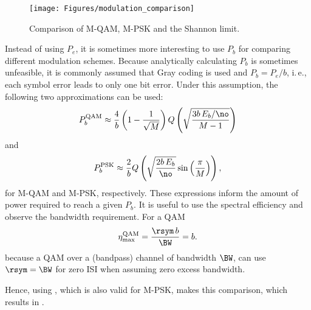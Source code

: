 
\begin{figure}[htbp]
\centering
\texttt{[image: Figures/modulation\_comparison]}
\caption{Comparison of M-QAM, M-PSK and the Shannon limit.\label{fig:modulation_comparison}}
\end{figure}

Instead of using $P_e$, it is sometimes more interesting to use $P_b$ for comparing different modulation schemes. Because analytically calculating $P_b$ is sometimes unfeasible, it is commonly assumed that Gray coding is used and $P_b = P_e / b$, i.\,e., each symbol error leads to only one bit error. Under this assumption, the following two approximations can be used:
\[
P_b^{\textrm{QAM}} \approx \frac{4}{b} \left(1-\frac{1}{\sqrt{M}} \right) Q\left(\sqrt{\frac{3 b \, E_b / \no}{M-1}} \right)
\]
and
\[
P_b^{\textrm{PSK}} \approx \frac{2}{b} Q\left(\sqrt{\frac{2 b \, E_b}{\no}} \sin \left( \frac{\pi}{M}\right) \right),
\]
for M-QAM and M-PSK, respectively. These expressions inform the amount of power required to reach a given $P_b$. It is useful to use the spectral efficiency and observe the bandwidth requirement. For a QAM
 \begin{equation}
 \eta_{\textrm{max}}^{\textrm{QAM}} = \frac {\rsym \, b} {\BW} =  b.
 \label{eq:qam_max_efficiency}
\end{equation}
because a QAM over a (bandpass) channel of bandwidth $\BW$, can use $\rsym = \BW$ for
zero ISI when assuming zero excess bandwidth.

Hence, using , which is also valid for M-PSK,  makes this comparison, which results in .


